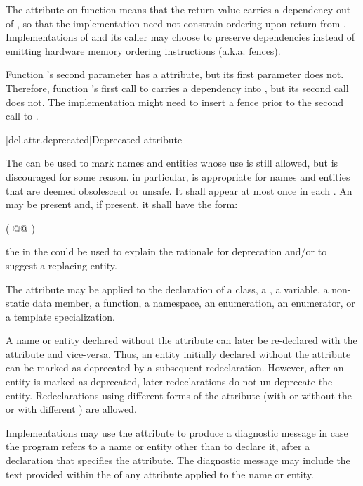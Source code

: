 \pnum
The  attribute on function  means that the
return value carries a dependency out of , so that the implementation
need not constrain ordering upon return from . Implementations of
 and its caller may choose to preserve dependencies instead of emitting
hardware memory ordering instructions (a.k.a. fences).

\pnum
Function 's second parameter has a  attribute,
but its first parameter does not. Therefore, function 's first call to
 carries a dependency into , but its second call does not. The
implementation might need to insert a fence prior to the second call to
.

\exitexample%
%

[dcl.attr.deprecated]{Deprecated attribute}%

\pnum
The   can be used to mark names and entities
whose use is still allowed, but is discouraged for some reason. \enternote in particular,
 is appropriate for names and entities that are deemed obsolescent or
unsafe. \exitnote It shall appear at most once in each . An
 may be present and, if present, it shall have the form:

\begin{codeblock}
( @@ )
\end{codeblock}
\enternote the  in the 
could be used to explain the rationale for deprecation and/or to suggest a replacing entity.
\exitnote

\pnum
The attribute may be applied to the declaration of
a class,
a ,
a variable,
a non-static data member,
a function,
a namespace,
an enumeration,
an enumerator, or
a template specialization.

\pnum
A name or entity declared without the  attribute can later be re-declared
with the attribute and vice-versa. \enternote Thus, an entity initially declared without the
attribute can be marked as deprecated by a subsequent redeclaration. However, after an entity
is marked as deprecated, later redeclarations do not un-deprecate the entity. \exitnote 
Redeclarations using different forms of the attribute (with or without the
 or with different
) are allowed.

\pnum
\enternote Implementations may use the attribute to produce a diagnostic
message in case the program refers to a name or entity other than to declare it, after a
declaration that specifies the attribute. The diagnostic message may include the text provided
within the  of any  attribute applied
to the name or entity. \exitnote
